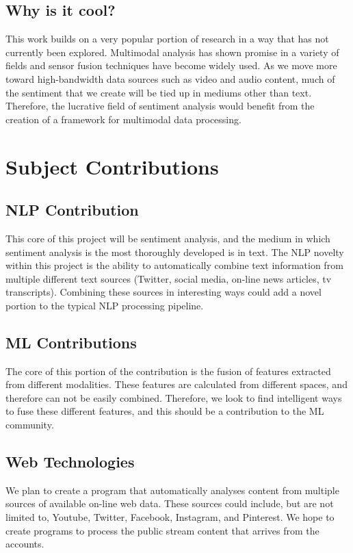 \documentclass[paper=a4, fontsize=11pt]{scrartcl} %
\begin{document}
\subsection{Why is it cool?}
This work builds on a very popular portion of research in a way that has not currently been explored. 
Multimodal analysis has shown promise in a variety of fields and sensor fusion techniques have become widely used.
As we move more toward high-bandwidth data sources such as video and audio content, much of the sentiment that we create will be tied up in mediums other than text.
Therefore, the lucrative field of sentiment analysis would benefit from the creation of a framework for multimodal data processing.

\section{Subject Contributions}
\subsection{NLP Contribution}
This core of this project will be sentiment analysis, and the medium in which sentiment analysis is the most thoroughly developed is in text.
The NLP novelty within this project is the ability to automatically combine text information from multiple different text sources (Twitter, social media, on-line news articles, tv transcripts).
Combining these sources in interesting ways could add a novel portion to the typical NLP processing pipeline.

\subsection{ML Contributions}
The core of this portion of the contribution is the fusion of features extracted from different modalities.
These features are calculated from different spaces, and therefore can not be easily combined.
Therefore, we look to find intelligent ways to fuse these different features, and this should be a contribution to the ML community.

\subsection{Web Technologies}
We plan to create a program that automatically analyses content from multiple sources of available on-line web data.
These sources could include, but are not limited to, Youtube, Twitter, Facebook, Instagram, and Pinterest.
We hope to create programs to process the public stream content that arrives from the accounts.
\end{document}
